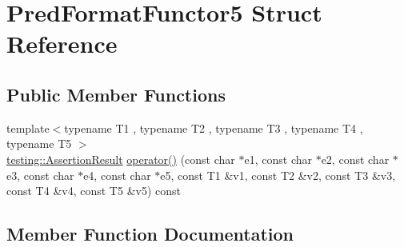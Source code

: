 \hypertarget{struct_pred_format_functor5}{}\section{Pred\+Format\+Functor5 Struct Reference}
\label{struct_pred_format_functor5}
\subsection*{Public Member Functions}
\begin{DoxyCompactItemize}
\item 
{\footnotesize template$<$typename T1 , typename T2 , typename T3 , typename T4 , typename T5 $>$ }\\\hyperlink{classtesting_1_1_assertion_result}{testing\+::\+Assertion\+Result} \hyperlink{struct_pred_format_functor5_afbadd6fc310c388477ce0c13aea58b30}{operator()} (const char $\ast$e1, const char $\ast$e2, const char $\ast$e3, const char $\ast$e4, const char $\ast$e5, const T1 \&v1, const T2 \&v2, const T3 \&v3, const T4 \&v4, const T5 \&v5) const 
\end{DoxyCompactItemize}


\subsection{Member Function Documentation}
